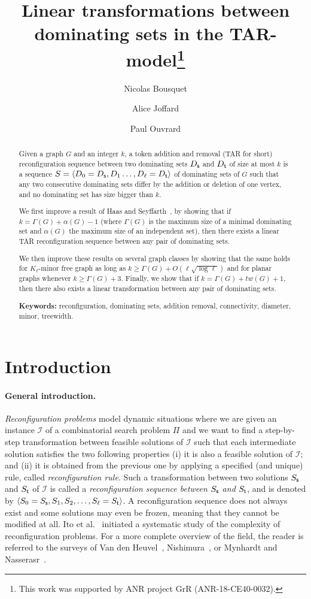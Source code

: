 \documentclass[10pt]{article}
\title{Linear transformations between dominating sets in the TAR-model\thanks{This work was supported by ANR project GrR (ANR-18-CE40-0032).}}
\author[1]{Nicolas Bousquet}
\author[1]{Alice Joffard}
\author[2]{Paul Ouvrard}
\affil[1]{CNRS, LIRIS, Universit\'e de Lyon, Universit\'e Claude Bernard Lyon 1, Lyon, France
\thanks{firstname.lastname@liris.cnrs.fr}}
\affil[2]{Univ. Bordeaux, Bordeaux INP, CNRS, LaBRI, UMR5800, F-33400 Talence, France \thanks{paul.ouvrard@u-bordeaux.fr}}
\date{}
\newcommand{\source}{{\sf s}}
\newcommand{\target}{{\sf t}}
\providecommand{\keywords}[1]{\textbf{Keywords:} #1}
\begin{document}
\maketitle

\begin{abstract}
Given a graph $G$ and an integer $k$, a token addition and removal ({\sf TAR} for short) reconfiguration sequence between two dominating sets $D_\source$ and $D_\target$ of size at most $k$ is a sequence $S= \langle D_0 = D_\source, D_1 \ldots, D_\ell = D_\target \rangle$ of dominating sets of $G$ such that any two consecutive dominating sets differ by the addition or deletion of one vertex, and no dominating set has size bigger than $k$. 

We first improve a result of Haas and Seyffarth~\cite{Haas17}, by showing that if $k=\Gamma(G)+\alpha(G)-1$ (where $\Gamma(G)$ is the maximum size of a minimal dominating set and $\alpha(G)$ the maximum size of an independent set), then there exists a linear {\sf TAR} reconfiguration sequence between any pair of dominating sets. 

We then improve these results on several graph classes by showing that the same holds for $K_{\ell}$-minor free graph as long as $k \ge \Gamma(G)+O(\ell \sqrt{\log \ell})$ and for planar graphs whenever $k \ge \Gamma(G)+3$.
Finally, we show that if $k=\Gamma(G)+tw(G)+1$, then there also exists a linear transformation between any pair of dominating sets.

\keywords{reconfiguration, dominating sets, addition removal, connectivity, diameter, minor, treewidth.}

\end{abstract}

\section{Introduction}
\paragraph{General introduction.}
{\em Reconfiguration problems} model dynamic situations where we are given an instance $\mathcal{I}$ of a combinatorial search problem $\Pi$ and we want to find a step-by-step transformation between feasible solutions of $\mathcal{I}$ such that each intermediate solution satisfies the two following properties (i) it is also a feasible solution of $\mathcal{I}$; and (ii) it is obtained from the previous one by applying a specified (and unique) rule, called {\em reconfiguration rule}. Such a transformation between two solutions $S_\source$ and $S_\target$ of $\mathcal{I}$ is called a {\em reconfiguration sequence between $S_\source$ and $S_\target$}, and is denoted by $\langle S_0 = S_\source, S_1, S_2, \ldots, S_\ell = S_\target \rangle$. A reconfiguration sequence does not always exist and some solutions may even be frozen, meaning that they cannot be modified at all. Ito et al.~\cite{Ito11} initiated a systematic study of the complexity of reconfiguration problems. For a more complete overview of the field, the reader is referred to the surveys of Van den Heuvel~\cite{Heuvel13}, Nishimura~\cite{Nishimura18}, or Mynhardt and Nasserasr~\cite{MynhardtSurvey}.
\end{document}
